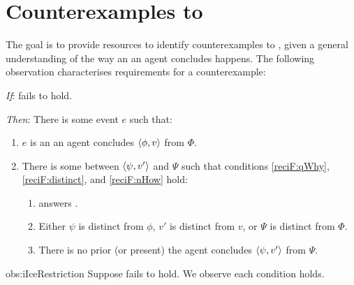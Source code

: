 \section{Counterexamples to \issueInclusion{}}


\begin{note}
  The goal is to provide resources to identify counterexamples to \issueInclusion{}, given a general understanding of the way an  an agent concludes happens.
  The following observation characterises requirements for a counterexample:

  \begin{observation}%
    \label{obs:iIceRestriction}%
    \vspace{-\baselineskip}
    \begin{itenum}
    \item[\emph{If}:]
      \issueInclusion{} fails to hold.
    \item[\emph{Then}:]
      There is some event \(e\) such that:
      \begin{enumerate}
      \item
        \(e\) is an  an agent concludes \(\langle\phi, v\rangle\) from \(\Phi\).
      \item
        There is some \fofr{} between \(\langle\psi, v'\rangle\) and \(\Psi\) such that conditions \ref{reciF:qWhy}, \ref{reciF:distinct}, and \ref{reciF:nHow} hold:
        \begin{enumerate}[label=\Alph*., ref=\Alph*]
        \item
          \label{reciF:qWhy}
           answers \qWhy{}.
        \item
          \label{reciF:distinct}
          Either \(\psi\) is distinct from \(\phi\), \(v'\) is distinct from \(v\), or \(\Psi\) is distinct from \(\Phi\).
        \item
          \label{reciF:nHow}
          There is no prior (or present)  the agent concludes \(\langle\psi, v'\rangle\) from \(\Psi\).
        \end{enumerate}
      \end{enumerate}
    \end{itenum}
    \vspace{-1.5\baselineskip}
  \end{observation}
  \begin{motivation}{obs:iIceRestriction}
    Suppose \issueInclusion{} fails to hold.
    We observe each condition holds.


\end{motivation}
\end{note}
